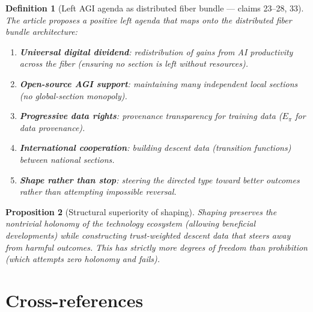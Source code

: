 \documentclass[11pt,a4paper]{article}
\newtheorem{definition}{Definition}[section]
\newtheorem{proposition}[definition]{Proposition}
\begin{document}
\begin{definition}[Left AGI agenda as distributed fiber bundle --- claims 23--28, 33]
\label{def:left-agenda}
The article proposes a positive left agenda that maps onto the distributed
fiber bundle architecture:
\begin{enumerate}
\item \textbf{Universal digital dividend}: redistribution of gains from
  AI productivity across the fiber (ensuring no section is left without
  resources).
\item \textbf{Open-source AGI support}: maintaining many independent local
  sections (no global-section monopoly).
\item \textbf{Progressive data rights}: provenance transparency for
  training data ($E_\pi$ for data provenance).
\item \textbf{International cooperation}: building descent data
  (transition functions) between national sections.
\item \textbf{Shape rather than stop}: steering the directed type toward
  better outcomes rather than attempting impossible reversal.
\end{enumerate}
\end{definition}

\begin{proposition}[Structural superiority of shaping]
\label{prop:shaping}
Shaping preserves the nontrivial holonomy of the technology ecosystem
(allowing beneficial developments) while constructing trust-weighted
descent data that steers away from harmful outcomes. This has strictly
more degrees of freedom than prohibition (which attempts zero holonomy
and fails).
\end{proposition}

\section{Cross-references}
\end{document}
